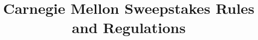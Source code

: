 \documentclass[openany]{report}
\title{Carnegie Mellon Sweepstakes Rules and Regulations}
\author{}
\begin{document}
\maketitle
\tableofcontents
\newpage














\begin{appendices}


\end{appendices}
\end{document}
